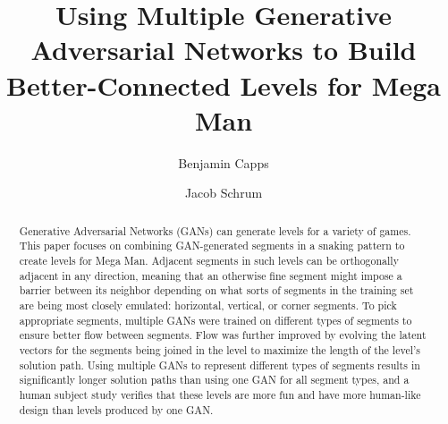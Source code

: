\documentclass[sigconf]{acmart}
\begin{document}
\title[Using Multiple GANs to Build Better-Connected Levels for Mega Man]{Using Multiple Generative Adversarial Networks to Build\\ Better-Connected Levels for Mega Man}


\author{Benjamin Capps}

\author{Jacob Schrum}





\begin{abstract}
Generative Adversarial Networks (GANs) can generate levels for a variety of games. This paper focuses on 
combining GAN-generated segments in a snaking pattern to create levels for Mega Man. Adjacent segments in such levels can be orthogonally adjacent in any direction, meaning that an otherwise fine segment might impose a barrier between its neighbor depending on what sorts of segments in the training set are being most closely emulated: horizontal, vertical, or corner segments. To pick appropriate segments, multiple GANs were trained on different types of segments to ensure better flow between segments. Flow was further improved by evolving the latent vectors for the segments being joined in the level to maximize the length of the level's solution path. Using multiple GANs to represent different types of segments results in significantly longer solution paths than using one GAN for all segment types, and a human subject study 
verifies that these levels are more fun and have more human-like design than levels produced by one GAN.
\end{abstract}

\end{document}
